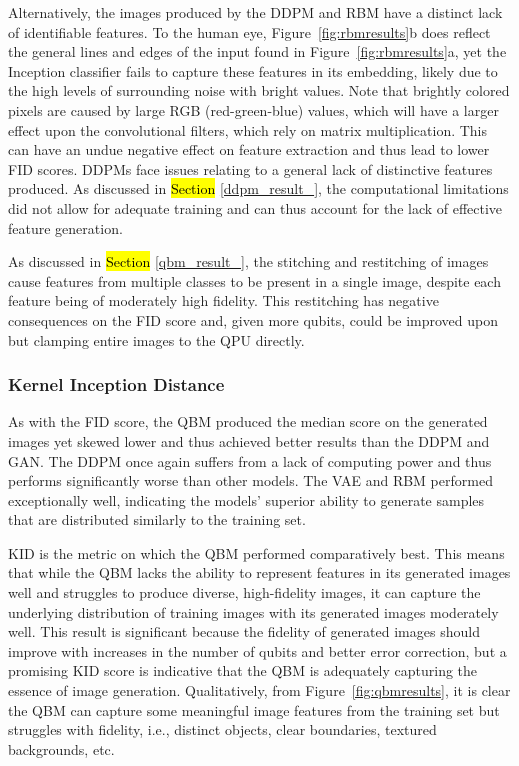 \documentclass[technologies,article,accept,pdftex,moreauthors]{Definitions/mdpi}
\newcommand{\figref}[1]{Figure~\ref{#1}}
\begin{document}
Alternatively, the images produced by the DDPM and RBM have a distinct lack of identifiable features. To the human eye, \figref{fig:rbmresults}b does reflect the general lines and edges of the input found in \figref{fig:rbmresults}a, yet the Inception classifier fails to capture these features in its embedding, likely due to the high levels of surrounding noise with bright values. Note that brightly colored pixels are caused by large RGB (red-green-blue) values, which will have a larger effect upon the convolutional filters, which rely on matrix multiplication. This can have an undue negative effect on feature extraction and thus lead to lower FID scores. DDPMs face issues relating to a general lack of distinctive features produced. As discussed in \hl{Section} \ref{ddpm_result_}, the computational limitations did not allow for adequate training and can thus account for the lack of effective feature generation. %


As discussed in \hl{Section} \ref{qbm_result_}, the stitching and restitching of images cause features from multiple classes to be present in a single image, despite each feature being of moderately high fidelity.  This restitching has negative consequences on the FID score and, given more qubits, could be improved upon but clamping entire images to the QPU directly. %


\subsubsection{Kernel Inception Distance}
As with the FID score, the QBM produced the median score on the generated images yet skewed lower and thus achieved better results than the DDPM and GAN. The DDPM once again suffers from a lack of computing power and thus performs significantly worse than other models. The VAE and RBM performed exceptionally well, indicating the models' superior ability to generate samples that are distributed similarly to the training set.


KID is the metric on which the QBM performed comparatively best. This means that while the QBM lacks the ability to represent features in its generated images well and struggles to produce diverse, high-fidelity images, it can capture the underlying distribution of training images with its generated images moderately well. This result is significant because the fidelity of generated images should improve with increases in the number of qubits and better error correction, but a promising KID score is indicative that the QBM is adequately capturing the essence of image generation. Qualitatively, from \figref{fig:qbmresults}, it is clear the QBM can capture some meaningful image features from the training set but struggles with fidelity, i.e., distinct objects, clear boundaries, textured backgrounds, etc.
\end{document}
